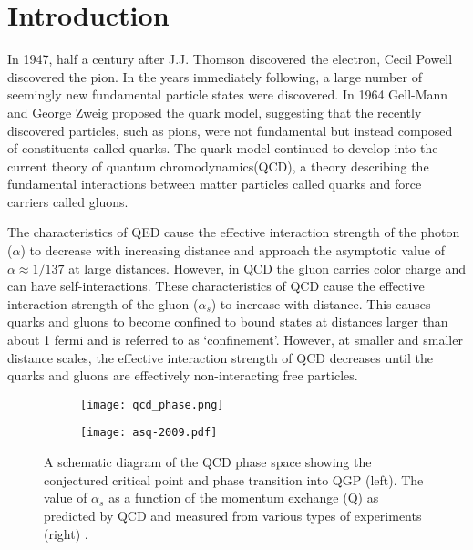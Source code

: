 \section{Introduction}
In 1947, half a century after J.J. Thomson discovered the electron, Cecil Powell discovered the pion\cite{occhialini_nuclear_1947}. In the years immediately following, a large number of seemingly new fundamental particle states were discovered. In 1964 Gell-Mann and George Zweig proposed the quark model, suggesting that the recently discovered particles, such as pions, were not fundamental but instead composed of constituents called quarks. The quark model continued to develop into the current theory of quantum chromodynamics(QCD), a theory describing the fundamental interactions between matter particles called quarks and force carriers called gluons. 

The characteristics of QED cause the effective interaction strength of the photon ($\alpha$) to decrease with increasing distance and approach the asymptotic value of $\alpha\approx1/137$ at large distances. However, in QCD the gluon carries color charge and can have self-interactions. These characteristics of QCD cause the effective interaction strength of the gluon ($\alpha_s$) to increase with distance. This causes quarks and gluons to become confined to bound states at distances larger than about 1 fermi and is referred to as `confinement'. However, at smaller and smaller distance scales, the effective interaction strength of QCD decreases until the quarks and gluons are effectively non-interacting free particles. 

	\begin{figure}
		\centering 
		\begin{subfigure}[b]{0.6\textwidth} 
			\texttt{[image: qcd\_phase.png]} 
			\label{fig:qcd_phase_diagram} 
		\end{subfigure} 
		\begin{subfigure}[b]{0.39\textwidth} 
			\texttt{[image: asq-2009.pdf]} 
			\label{fig:qcd_running_coupling} 
		\end{subfigure} 
		\caption{ A schematic diagram of the QCD phase space showing the conjectured critical point and phase transition into QGP (left)\cite{bicudo_chiral_2011}. The value of $\alpha_{s}$ as a function of the momentum exchange (Q) as predicted by QCD and measured from various types of experiments (right) \cite{bethke_2009_2009}. } 
	\end{figure}

